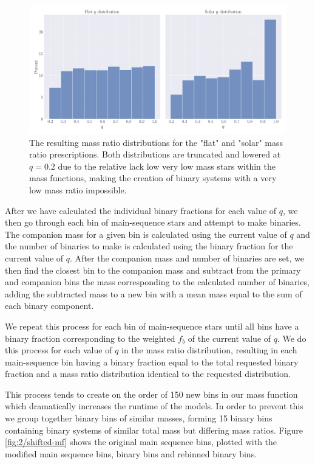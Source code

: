 \begin{figure}
    \centering
    \includegraphics[width=\textwidth]{figures/q-dists.png}
    \caption{The resulting mass ratio distributions for the "flat" and "solar" mass ratio
        prescriptions. Both distributions are truncated and lowered at $q=0.2$ due to the relative
        lack low very low mass stars within the mass functions, making the creation of binary
        systems with a very low mass ratio impossible.}
    \label{fig:2/q-dists}
\end{figure}


After we have calculated the individual binary fractions for each value of $q$, we then go through
each bin of main-sequence stars and attempt to make binaries. The companion mass for a given bin is
calculated using the current value of $q$ and the number of binaries to make is calculated using the
binary fraction for the current value of $q$. After the companion mass and number of binaries are
set, we then find the closest bin to the companion mass and subtract from the primary and companion
bins the mass corresponding to the calculated number of binaries, adding the subtracted mass to a
new bin with a mean mass equal to the sum of each binary component.


We repeat this process for each bin of main-sequence stars until all bins have a binary fraction
corresponding to the weighted $f_b$ of the current value of $q$. We do this process for each value
of $q$ in the mass ratio distribution, resulting in each main-sequence bin having a binary fraction
equal to the total requested binary fraction and a mass ratio distribution identical to the
requested distribution.


This process tends to create on the order of 150 new bins in our mass function which dramatically
increases the runtime of the  models. In order to prevent this we group together binary
bins of similar masses, forming 15 binary bins containing binary systems of similar total mass but
differing mass ratios. Figure \ref{fig:2/shifted-mf} shows the original main sequence bins, plotted
with the modified main sequence bins, binary bins and rebinned binary bins.


